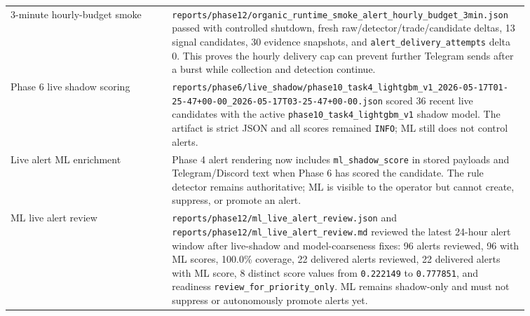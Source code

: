 \documentclass{article}
\begin{document}
\begin{longtable}{p{0.30\linewidth}p{0.56\linewidth}}
3-minute hourly-budget smoke & \texttt{reports/phase12/organic\_runtime\_smoke\_alert\_hourly\_budget\_3min.json} passed with controlled shutdown, fresh raw/detector/trade/candidate deltas, 13 signal candidates, 30 evidence snapshots, and \texttt{alert\_delivery\_attempts} delta 0. This proves the hourly delivery cap can prevent further Telegram sends after a burst while collection and detection continue. \\
Phase 6 live shadow scoring & \texttt{reports/phase6/live\_shadow/phase10\_task4\_lightgbm\_v1\_2026-05-17T01-25-47+00-00\_2026-05-17T03-25-47+00-00.json} scored 36 recent live candidates with the active \texttt{phase10\_task4\_lightgbm\_v1} shadow model. The artifact is strict JSON and all scores remained \texttt{INFO}; ML still does not control alerts. \\
Live alert ML enrichment & Phase 4 alert rendering now includes \texttt{ml\_shadow\_score} in stored payloads and Telegram/Discord text when Phase 6 has scored the candidate. The rule detector remains authoritative; ML is visible to the operator but cannot create, suppress, or promote an alert. \\
ML live alert review & \texttt{reports/phase12/ml\_live\_alert\_review.json} and \texttt{reports/phase12/ml\_live\_alert\_review.md} reviewed the latest 24-hour alert window after live-shadow and model-coarseness fixes: 96 alerts reviewed, 96 with ML scores, 100.0\% coverage, 22 delivered alerts reviewed, 22 delivered alerts with ML score, 8 distinct score values from \texttt{0.222149} to \texttt{0.777851}, and readiness \texttt{review\_for\_priority\_only}. ML remains shadow-only and must not suppress or autonomously promote alerts yet. \\
\end{longtable}
\end{document}
